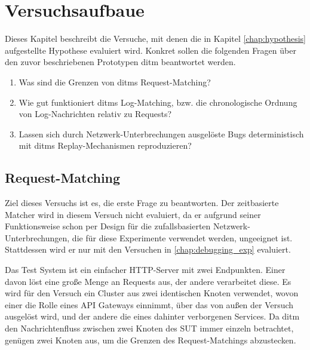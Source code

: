 \documentclass[12pt,a4paper]{report}
\begin{document}
\chapter{Versuchsaufbaue}
Dieses Kapitel beschreibt die Versuche, mit denen die in Kapitel \ref{chap:hypothesis} aufgestellte Hypothese evaluiert wird.
Konkret sollen die folgenden Fragen über den zuvor beschriebenen Prototypen ditm beantwortet werden.
\begin{enumerate}
	\item Was sind die Grenzen von ditms Request-Matching?
	\item Wie gut funktioniert ditms Log-Matching, bzw. die chronologische Ordnung von Log-Nachrichten relativ zu Requests?
	\item Lassen sich durch Netzwerk-Unterbrechungen ausgelöste Bugs deterministisch mit ditms Replay-Mechanismen reproduzieren?
\end{enumerate}
\section{Request-Matching}
\label{chap:exp_matching}
Ziel dieses Versuchs ist es, die erste Frage zu beantworten.
Der zeitbasierte Matcher wird in diesem Versuch nicht evaluiert, da er aufgrund seiner Funktionsweise schon per Design für die
zufallsbasierten Netzwerk-Unterbrechungen, die für diese Experimente verwendet werden, ungeeignet ist. Stattdessen wird er nur mit
den Versuchen in \ref{chap:debugging_exp} evaluiert.

Das Test System ist ein einfacher HTTP-Server mit zwei Endpunkten. Einer davon löst eine große Menge an Requests aus, der andere
verarbeitet diese. Es wird für den Versuch ein Cluster aus zwei identischen Knoten verwendet, wovon einer die Rolle eines API
Gateways einnimmt, über das von außen der Versuch ausgelöst wird, und der andere die eines dahinter verborgenen Services. Da ditm
den Nachrichtenfluss zwischen zwei Knoten des SUT immer einzeln betrachtet, genügen zwei Knoten aus, um die Grenzen des
Request-Matchings abzustecken.
\end{document}
